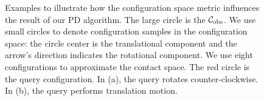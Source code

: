 \begin{figure}[!h]
\centering
{}
\caption[Examples to illustrate how the configuration space metric influences the result of our PD algorithm]{Examples to illustrate how the configuration space metric influences the result of our PD algorithm. The large circle is the $\mathcal C_{\text{obs}}$. We use small circles to denote configuration samples in the configuration space: the circle center is the translational component and the arrow's direction indicates the rotational component. We use eight configurations to approximate the contact space. The red circle is the query configuration. In (a), the query rotates counter-clockwise. In (b), the query performs translation motion.}\label{fig:2:toybenchmark}
\end{figure}

